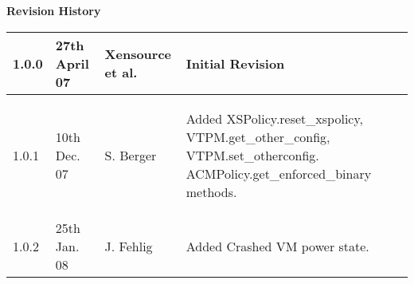{ \bf Revision History}

\begin{center}
 \begin{tabular}{|l|l|l|l|}
  \hline
  1.0.0 & 27th April 07 & Xensource et al. &
   \begin{minipage}[t][.7cm]{7cm}
     Initial Revision
   \end{minipage}\\
  \hline
  1.0.1 & 10th Dec. 07 & S. Berger &
   \begin{minipage}[t]{7cm}
    \begin{flushleft}
     Added XSPolicy.reset\_xspolicy, VTPM.get\_other\_config,
     VTPM.set\_otherconfig. ACMPolicy.get\_enforced\_binary methods.
    \end{flushleft}
   \end{minipage}\\
  \hline
  1.0.2 & 25th Jan. 08 & J. Fehlig &
   \begin{minipage}[t]{7cm}
    \begin{flushleft}
     Added Crashed VM power state.
    \end{flushleft}
   \end{minipage}\\
  \hline
 \end{tabular}
\end{center}